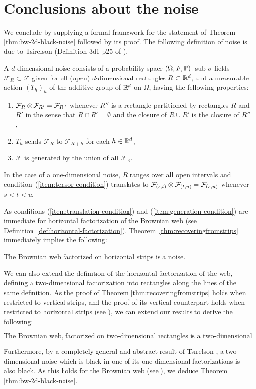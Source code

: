 {
\section{Conclusions about the noise}
\label{sec:conclusions-about-the-noise}

We conclude by supplying a formal framework for the statement of
Theorem \ref{thm:bw-2d-black-noise} followed by its proof.
The following definition of noise is due to Tsirelson (Definition
3d1 p25 of \cite{tsirelson-nonclassical-stochastic-flows}).

\newcommand{\F}{\mathcal{F}}
A $d$-dimensional noise consists of a probability space $(\Omega,F,
\P)$, sub-$\sigma$-fields $\F_R \subset \F$ given for all (open)
$d$-dimensional rectangles $R \subset \R^d$, and a measurable action
$(T_h)_h$ of the additive group of $\R^d$ on $\Omega$, having the following properties:

\begin{enumerate}
\item \label{item:tensor-condition} $\F_R \tensor \F_{R'} = \F_{R''}$ whenever $R''$ is a
rectangle partitioned by rectangles $R$ and $R'$ in the sense that
$R\cap R'=\emptyset$ and the closure of $R \cup R'$
is the closure of $R''$,
\item \label{item:translation-condition} $T_h$ sends $\F_R$ to $\F_{R+h}$ for each $h \in \R^d$,
\item \label{item:generation-condition} $\F$ is generated by the union of all $\F_R$.
\end{enumerate}

In the case of a one-dimensional noise, $R$ ranges over all open intervals
and condition~(\ref{item:tensor-condition}) translates to
$\F_{(s,t)} \tensor \F_{(t,u)} = \F_{(s,u)}$ whenever $s < t < u$.

As conditions (\ref{item:translation-condition}) and
(\ref{item:generation-condition}) are immediate for
horizontal factorization of the Brownian web (see
Definition~\ref{def:horizontal-factorization}),
Theorem~\ref{thm:recoveringfromstrips} immediately
implies the following:

\begin{theorem}
The Brownian web factorized on horizontal strips is a noise.
\end{theorem}

We can also extend the definition of the horizontal
factorization of the web, defining a two-dimensional
factorization into rectangles along the lines of the
same definition. As the proof of Theorem \ref{thm:recoveringfromstrips}
holds when restricted to vertical strips, and the proof of its vertical
counterpart holds when restricted to horizontal strips (see ), we can extend our results to derive the following:

\[\text{The Brownian web, factorized on two-dimensional
rectangles is a two-dimensional noise.}\]

Furthermore, by a completely general and abstract result
of Tsirelson , a two-dimensional noise which is
black in one of its one-dimensional factorizations is also
black. As this holds for the Brownian web (see ),
we deduce Theorem \ref{thm:bw-2d-black-noise}.
}
